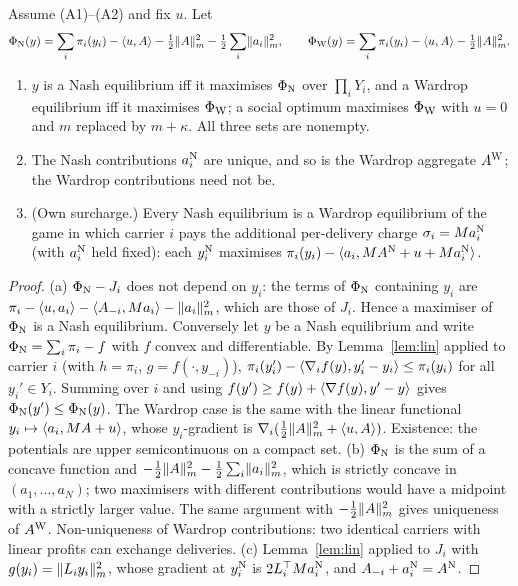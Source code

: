 \begin{lemma}\label{lem:pot}
Assume (A1)--(A2) and fix $u$. Let
\[
\Phi_{\mathrm{N}}(y)=\sum_i\pi_i(y_i)-\langle u,A\rangle-\tfrac12\lVert A\rVert_m^2-\tfrac12\sum_i\lVert a_i\rVert_m^2,\qquad
\Phi_{\mathrm{W}}(y)=\sum_i\pi_i(y_i)-\langle u,A\rangle-\tfrac12\lVert A\rVert_m^2 .
\]
\begin{enumerate}
\item[(a)] $y$ is a Nash equilibrium iff it maximises $\Phi_{\mathrm{N}}$ over $\prod_iY_i$, and a Wardrop equilibrium iff it maximises $\Phi_{\mathrm{W}}$; a social optimum maximises $\Phi_{\mathrm{W}}$ with $u=0$ and $m$ replaced by $m+\kappa$. All three sets are nonempty.
\item[(b)] The Nash contributions $a_i^{\mathrm{N}}$ are unique, and so is the Wardrop aggregate $A^{\mathrm{W}}$; the Wardrop contributions need not be.
\item[(c)] (Own surcharge.) Every Nash equilibrium is a Wardrop equilibrium of the game in which carrier $i$ pays the additional per-delivery charge $\sigma_i=Ma_i^{\mathrm{N}}$ (with $a_i^{\mathrm{N}}$ held fixed): each $y_i^{\mathrm{N}}$ maximises $\pi_i(y_i)-\langle a_i,MA^{\mathrm{N}}+u+Ma_i^{\mathrm{N}}\rangle$.
\end{enumerate}
\end{lemma}
\begin{proof}
(a) $\Phi_{\mathrm{N}}-J_i$ does not depend on $y_i$: the terms of $\Phi_{\mathrm{N}}$ containing $y_i$ are $\pi_i-\langle u,a_i\rangle-\langle A_{-i},Ma_i\rangle-\lVert a_i\rVert_m^2$, which are those of $J_i$. Hence a maximiser of $\Phi_{\mathrm{N}}$ is a Nash equilibrium. Conversely let $y$ be a Nash equilibrium and write $\Phi_{\mathrm{N}}=\sum_i\pi_i-f$ with $f$ convex and differentiable. By Lemma~\ref{lem:lin} applied to carrier $i$ (with $h=\pi_i$, $g=f(\cdot,y_{-i})$), $\pi_i(y_i')-\langle \nabla_if(y),y_i'-y_i\rangle\le\pi_i(y_i)$ for all $y_i'\in Y_i$. Summing over $i$ and using $f(y')\ge f(y)+\langle \nabla f(y),y'-y\rangle$ gives $\Phi_{\mathrm{N}}(y')\le\Phi_{\mathrm{N}}(y)$. The Wardrop case is the same with the linear functional $y_i\mapsto\langle a_i,MA+u\rangle$, whose $y_i$-gradient is $\nabla_i(\tfrac12\lVert A\rVert_m^2+\langle u,A\rangle)$. Existence: the potentials are upper semicontinuous on a compact set.
(b) $\Phi_{\mathrm{N}}$ is the sum of a concave function and $-\tfrac12\lVert A\rVert_m^2-\tfrac12\sum_i\lVert a_i\rVert_m^2$, which is strictly concave in $(a_1,\dots,a_N)$; two maximisers with different contributions would have a midpoint with a strictly larger value. The same argument with $-\tfrac12\lVert A\rVert_m^2$ gives uniqueness of $A^{\mathrm{W}}$. Non-uniqueness of Wardrop contributions: two identical carriers with linear profits can exchange deliveries.
(c) Lemma~\ref{lem:lin} applied to $J_i$ with $g(y_i)=\lVert L_iy_i\rVert_m^2$, whose gradient at $y_i^{\mathrm{N}}$ is $2L_i^\top Ma_i^{\mathrm{N}}$, and $A_{-i}+a_i^{\mathrm{N}}=A^{\mathrm{N}}$.
\end{proof}

